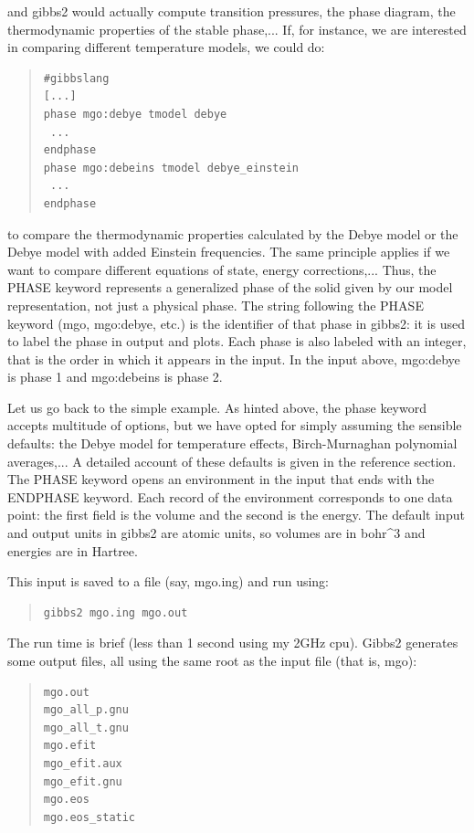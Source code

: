 \documentclass[a4paper]{article}
\begin{document}
and gibbs2 would actually compute transition pressures, the phase
diagram, the thermodynamic properties of the stable phase,... If, for
instance, we are interested in comparing different temperature models,
we could do:
%
\begin{quote}
\begin{verbatim}
#gibbslang
[...]
phase mgo:debye tmodel debye
 ...
endphase
phase mgo:debeins tmodel debye_einstein
 ...
endphase
\end{verbatim}
\end{quote}

to compare the thermodynamic properties calculated by the Debye model
or the Debye model with added Einstein frequencies. The same principle
applies if we want to compare different equations of state, energy
corrections,... Thus, the PHASE keyword represents a generalized
phase of the solid given by our model representation, not just a
physical phase. The string following the PHASE keyword (mgo,
mgo:debye, etc.) is the identifier of that phase in gibbs2: it is used
to label the phase in output and plots. Each phase is also labeled
with an integer, that is the order in which it appears in the
input. In the input above, mgo:debye is phase 1 and
mgo:debeins is phase 2.

Let us go back to the simple example. As hinted above, the phase
keyword accepts multitude of options, but we have opted for simply
assuming the sensible defaults: the Debye model for temperature
effects, Birch-Murnaghan polynomial averages,... A detailed account of
these defaults is given in the reference section. The PHASE keyword
opens an environment in the input that ends with the ENDPHASE
keyword. Each record of the environment corresponds to one data point:
the first field is the volume and the second is the energy. The
default input and output units in gibbs2 are atomic units, so volumes
are in bohr\textasciicircum{}3 and energies are in Hartree.

This input is saved to a file (say, mgo.ing) and run using:
%
\begin{quote}
\begin{verbatim}
gibbs2 mgo.ing mgo.out
\end{verbatim}
\end{quote}

The run time is brief (less than 1 second using my 2GHz cpu). Gibbs2
generates some output files, all using the same root as the input file
(that is, mgo):
%
\begin{quote}
\begin{verbatim}
mgo.out
mgo_all_p.gnu
mgo_all_t.gnu
mgo.efit
mgo_efit.aux
mgo_efit.gnu
mgo.eos
mgo.eos_static
\end{verbatim}
\end{quote}
\end{document}
